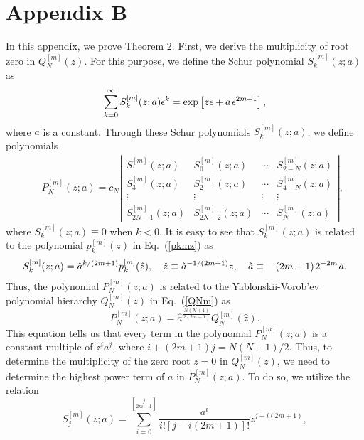 \documentclass[amsmath,amssymb]{revtex4}
\def\[{\begin{equation}}
\def\]{\end{equation}}
\begin{document}
\section*{Appendix B}
In this appendix, we prove Theorem 2. First, we derive the multiplicity of root zero in $Q_{N}^{[m]}(z)$. For this purpose, we define the Schur polynomial $S^{[m]}_k(z; a)$ as
\begin{equation} \label{Skza}
\sum_{k=0}^{\infty}S^{[m]}_k(z; a) \epsilon^k
=\exp\left[z\epsilon +a \hspace{0.04cm} \epsilon^{2m+1}\right],
\end{equation}
where $a$ is a constant. Through these Schur polynomials $S^{[m]}_k(z; a)$, we define polynomials
\begin{eqnarray} \label{PNza}
&& P^{[m]}_{N} (z; a) = c_{N} \left| \begin{array}{cccc}
         S^{[m]}_{1}(z; a) & S^{[m]}_{0}(z; a) & \cdots &  S^{[m]}_{2-N}(z; a) \\
         S^{[m]}_{3}(z; a) & S^{[m]}_{2}(z; a) & \cdots &  S^{[m]}_{4-N}(z; a) \\
        \vdots& \vdots & \vdots & \vdots \\
         S^{[m]}_{2N-1}(z; a) & S^{[m]}_{2N-2}(z; a) & \cdots &  S^{[m]}_{N}(z; a)
       \end{array}
 \right|,
\end{eqnarray}
where $S^{[m]}_k(z; a)\equiv 0$ when $k< 0$. It is easy to see that $S^{[m]}_k(z; a)$ is related to the polynomial $p_{k}^{[m]}(z)$ in Eq.~(\ref{pkmz}) as
\begin{equation}
S^{[m]}_k(z; a)=\hat{a}^{k/(2m+1)}p_{k}^{[m]}(\hat{z}),  \quad \hat{z}\equiv \hat{a}^{-1/(2m+1)}z,
\quad \hat{a}\equiv -\hspace{0.04cm} (2m+1) \hspace{0.04cm} 2^{-2m} \hspace{0.03cm} a.
\end{equation}
Thus, the polynomial $P^{[m]}_{N} (z; a)$ is related to the Yablonskii-Vorob'ev polynomial hierarchy $Q_{N}^{[m]}(z)$ in Eq.~(\ref{QNm}) as
\[
P^{[m]}_{N} (z; a)=\hat{a}^{\frac{N(N+1)}{2(2m+1)}} Q_{N}^{[m]}(\hat{z}).
\]
This equation tells us that every term in the polynomial $P^{[m]}_{N} (z; a)$ is a constant multiple of $z^ia^j$, where $i+(2m+1)j=N(N+1)/2$. Thus, to determine the multiplicity of the zero root $z=0$ in $Q_{N}^{[m]}(z)$, we need to determine the highest power term of $a$ in $P^{[m]}_{N} (z; a)$. To do so, we utilize the relation
\[ \label{Sjzarelation}
S^{[m]}_j(z; a)=\sum_{i=0}^{\left[\frac{j}{2m+1}\right]} \frac{a^i}{i! [j-i(2m+1)]!}z^{j-i(2m+1)},
\]
\end{document}
